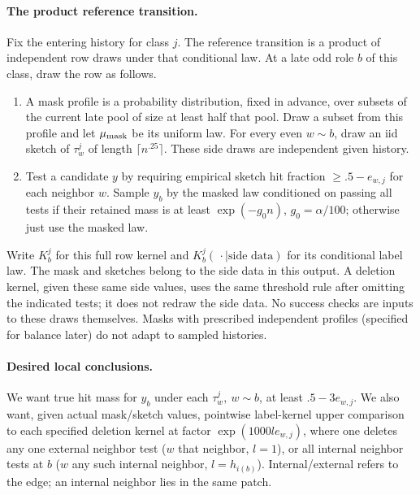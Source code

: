 \paragraph{The product reference transition.}
Fix the entering history for class \(j\). The reference transition is a
product of independent row draws under that conditional law. At a late odd
role \(b\) of this class, draw the row as follows.
\begin{enumerate}
\item A mask profile is a probability distribution, fixed in advance,
over subsets of the current late pool of size at least half that pool.
Draw a subset from this profile and let \(\mu_{\rm mask}\) be its uniform law. For every even
\(w\sim b\), draw an iid sketch of \(\tau_w^j\) of length
\(\lceil n^{.25}\rceil\). These side draws are independent given history.
\item Test a candidate \(y\) by requiring empirical sketch hit fraction
\(\ge .5-e_{w,j}\) for each neighbor \(w\). Sample \(y_b\) by the masked
law conditioned on passing all tests if their retained mass is at least
\(\exp(-g_0n)\), \(g_0=\alpha/100\); otherwise just use the masked law.
\end{enumerate}
Write \(K_b^j\) for this full row kernel and
\(K_b^j(\,\cdot\mid\text{side data})\) for its conditional label law.
The mask and sketches belong to the side data in this output. A deletion kernel, given
these same side values, uses the same threshold rule after omitting the
indicated tests; it does not redraw the side data. No success checks are
inputs to these draws themselves. Masks with prescribed independent
profiles (specified for balance later) do not adapt to sampled histories.

\paragraph{Desired local conclusions.}
We want true hit mass for \(y_b\) under each \(\tau_w^j,\ w\sim b\), at least \(.5-3e_{w,j}\). We also want, given actual mask/sketch values, pointwise label-kernel upper comparison to each specified deletion kernel at factor \(\exp(1000 l e_{w,j})\), where one deletes any one external neighbor test (\(w\) that neighbor, \(l=1\)), or all internal neighbor tests at \(b\) (\(w\) any such internal neighbor, \(l=h_{i(b)}\)). Internal/external refers to the edge; an internal neighbor lies in the same patch.

